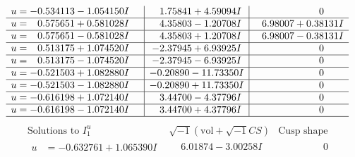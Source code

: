 \documentclass[1p]{elsarticle_modified}
\theoremstyle{definition}
\newcommand{\I}{\sqrt{-1}}
\begin{document}
$$\begin{array}{c|c|c}
\begin{aligned}
u &= -0.534113 - 1.054150 I\end{aligned}
 & \phantom{-}1.75841 + 4.59094 I & \phantom{-0.000000 } 0 \\ \hline\begin{aligned}
u &= \phantom{-}0.575651 + 0.581028 I\end{aligned}
 & \phantom{-}4.35803 - 1.20708 I & \phantom{-}6.98007 + 0.38131 I \\ \hline\begin{aligned}
u &= \phantom{-}0.575651 - 0.581028 I\end{aligned}
 & \phantom{-}4.35803 + 1.20708 I & \phantom{-}6.98007 - 0.38131 I \\ \hline\begin{aligned}
u &= \phantom{-}0.513175 + 1.074520 I\end{aligned}
 & -2.37945 + 6.93925 I & \phantom{-0.000000 } 0 \\ \hline\begin{aligned}
u &= \phantom{-}0.513175 - 1.074520 I\end{aligned}
 & -2.37945 - 6.93925 I & \phantom{-0.000000 } 0 \\ \hline\begin{aligned}
u &= -0.521503 + 1.082880 I\end{aligned}
 & -0.20890 - 11.73350 I & \phantom{-0.000000 } 0 \\ \hline\begin{aligned}
u &= -0.521503 - 1.082880 I\end{aligned}
 & -0.20890 + 11.73350 I & \phantom{-0.000000 } 0 \\ \hline\begin{aligned}
u &= -0.616198 + 1.072140 I\end{aligned}
 & \phantom{-}3.44700 - 4.37796 I & \phantom{-0.000000 } 0 \\ \hline\begin{aligned}
u &= -0.616198 - 1.072140 I\end{aligned}
 & \phantom{-}3.44700 + 4.37796 I & \phantom{-0.000000 } 0\\
 \hline 
 \end{array}$$\newpage$$\begin{array}{c|c|c}  
\text{Solutions to }I^u_{1}& \I (\text{vol} + \sqrt{-1}CS) & \text{Cusp shape}\\
 \hline 
\begin{aligned}
u &= -0.632761 + 1.065390 I\end{aligned}
 & \phantom{-}6.01874 - 3.00258 I & \phantom{-0.000000 } 0 \\ \hline\begin{aligned}

\end{aligned}
\end{array}$$
\end{document}
